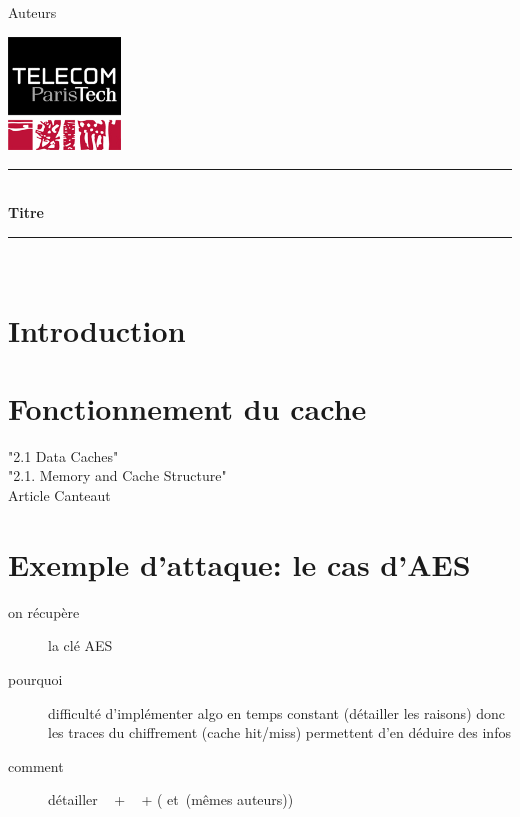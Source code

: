 \documentclass[a4paper,11pt]{article}
\newcommand{\HRule}{\rule{\linewidth}{0.5mm}}
\newcommand{\reporttitle}{Titre}
\newcommand{\reportauthor}{Auteurs}
\begin{document}
	

\begin{center}

\begin{minipage}[t]{0.4\textwidth}
  \begin{flushleft} \large
    \reportauthor
  \vfill
  \end{flushleft}
\end{minipage}
\begin{minipage}[t]{0.5\textwidth}
  \begin{flushright}
  \includegraphics [width=30mm]{figures/tpt.jpg} \\[0.5cm]
  \end{flushright}
\end{minipage}
\HRule \\[0.5cm]
{\huge \bfseries \reporttitle}\\[0.3cm]
\HRule \\[1.5cm]

\end{center}

\section*{Introduction} %

\section{Fonctionnement du cache}

"2.1 Data Caches"~\cite{brumley2009cache}\\
"2.1. Memory and Cache Structure"~\cite{tromer2010efficient}\\
Article Canteaut~\cite{canteaut2006understanding}

\section{Exemple d'attaque: le cas d'AES}

\begin{description}
\item[on récupère] la clé AES
\item[pourquoi] difficulté d'implémenter algo en temps constant (détailler les raisons) donc les traces du chiffrement (cache hit/miss) permettent d'en déduire des infos
\item[comment] détailler  ~\cite{canteaut2006understanding} + ~\cite{bernstein2005cache} + (\cite{tromer2010efficient} et~\cite{osvik2006cache}(mêmes auteurs))
\end{description}
\end{document}
